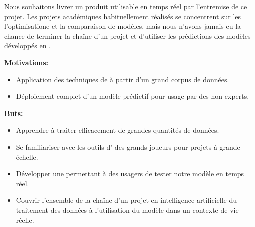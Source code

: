 Nous souhaitons livrer un produit utilisable en temps réel par l'entremise de ce projet. 
Les projets académiques habituellement réalisés se concentrent sur les l'optimisatione et la comparaison de modèles, mais nous n'avons jamais eu la chance de terminer la chaîne d'un projet et d'utiliser les prédictions des modèles développés en .

\vspace{5mm}
\textbf{Motivations:}
\begin{itemize}
  \item Application des techniques de  à partir d'un grand corpus de données.
  \item Déploiement complet d'un modèle prédictif pour usage par des non-experts.
\end{itemize}

\vspace{0mm}
\textbf{Buts:}
\begin{itemize}
  \item Apprendre à traiter efficacement de grandes quantités de données.
  \item Se familiariser avec les outils d' des grands joueurs pour projets à grande échelle.
  \item Développer une  permettant à des usagers de tester notre modèle en temps réel.
  \item Couvrir l'ensemble de la chaîne d'un projet en intelligence artificielle du traitement des données à l'utilisation du modèle dans un contexte de vie réelle.
\end{itemize}